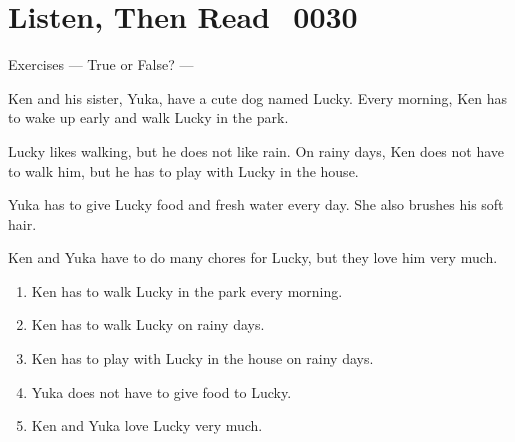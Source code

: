 \documentclass[aspectratio=169,xcolor={dvipsnames,table}]{beamer}
\newcommand{\myaudio}[1]{\href{#1}{\faVolumeUp}}
\begin{document}
\section{Listen, Then Read\,\,\,\,\,{\tiny 0030}\,{\scriptsize \myaudio{./audio/014_have_to_reading.mp3}}}
\begin{frame}[plain,t]{Exercises --- True or False? ---}
\vspace*{-8pt}
\begin{tcolorbox}[colframe=ForestGreen,
  colback=NavyBlue!10!white,
  colbacktitle=NavyBlue!40!white,
  coltitle=black, %
before upper={\setlength{\parindent}{1.25em}},
 title={Taking Care of Lucky\hfill{\tiny 0030}\quad{\scriptsize \myaudio{./audio/014_have_to_reading.mp3}}}
]
\noindent{}Ken and his sister, Yuka, have a cute dog named Lucky. Every morning, Ken has to wake up early and walk Lucky in the park.

Lucky likes walking, but he does not like rain. On rainy days, Ken does not have to walk him, but he has to play with Lucky in the house.

Yuka has to give Lucky food and fresh water every day. She also brushes his soft hair.

Ken and Yuka have to do many chores for Lucky, but they love him very much.
\end{tcolorbox}

\vspace{-6pt}
\begin{enumerate}\setlength{\itemsep}{-3.2pt}
\item<2-> Ken has to walk Lucky in the park every morning.\hfill{}
\item<2-> Ken has to walk Lucky on rainy days.\hfill{}
\item<2-> Ken has to play with Lucky in the house on rainy days.\hfill{}
\item<2-> Yuka does not have to give food to Lucky.\hfill{}
\item<2-> Ken and Yuka love Lucky very much.\hfill{}
\end{enumerate}
\end{frame}
\end{document}
